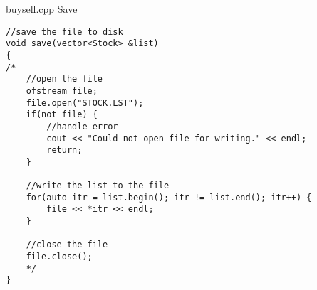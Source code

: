 \documentclass[]{beamer}
\begin{document}
\begin{frame}[fragile]{buysell.cpp Save}
\begin{adjustbox}{max totalheight=0.90\textheight}
\begin{BVerbatim}
//save the file to disk
void save(vector<Stock> &list) 
{
/*
    //open the file
    ofstream file;
    file.open("STOCK.LST");
    if(not file) {
        //handle error
        cout << "Could not open file for writing." << endl;
        return;
    }

    //write the list to the file
    for(auto itr = list.begin(); itr != list.end(); itr++) {
        file << *itr << endl;
    }

    //close the file
    file.close();
    */
}
\end{BVerbatim}
\end{adjustbox}
\end{frame}
\end{document}
